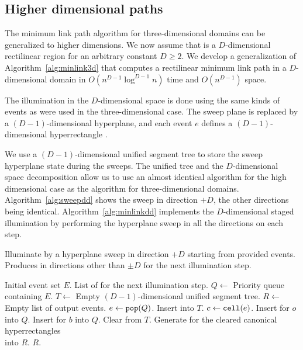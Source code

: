 \documentclass[english,gradu]{tktltiki2018}
\begin{document}
\subsection{Higher dimensional paths}

The minimum link path algorithm for three-dimensional domains can be generalized to higher dimensions.
We now assume that \fspace is a $D$-dimensional rectilinear region for an arbitrary constant $D\ge 2$.
We develop a generalization of Algorithm~\ref{alg:minlink3d} that computes a rectilinear minimum link path in a $D$-dimensional domain in $O(n^{D-1}\log^{D-1}n)$ time and $O(n^{D-1})$ space.

The illumination in the $D$-dimensional space is done using the same kinds of events as were used in the three-dimensional case.
The sweep plane is replaced by a $(D-1)$-dimensional hyperplane, and each event $e$ defines a $(D-1)$-dimensional hyperrectangle .

We use a $(D-1)$-dimensional unified segment tree to store the sweep hyperplane state during the sweeps.
The unified tree and the $D$-dimensional space decomposition allow us to use an almost identical algorithm for the high dimensional case as the algorithm for three-dimensional domains.
Algorithm~\ref{alg:sweepdd} shows the sweep in direction $+D$, the other directions being identical.
Algorithm~\ref{alg:minlinkdd} implements the $D$-dimensional staged illumination by performing the hyperplane sweep in all the directions on each step.

\begin{algorithm}
\caption{Illuminate by a hyperplane sweep in direction $+D$ starting from provided events.
	Produces \addEs in directions other than $\pm D$ for the next illumination step.}
\label{alg:sweepdd}
\begin{algorithmic}
\Require Initial event set $E$.
\Output List of \addEs for the next illumination step.
\State $Q\gets$ Priority queue containing $E$.
\State $T\gets$ Empty $(D-1)$-dimensional unified segment tree.
\State $R\gets$ Empty list of output events.
	\State $e\gets\texttt{pop}(Q)$.
		\State Insert  into $T$.
			\State $c\gets\mathtt{cell}(e)$.
				\State Insert \obsE for $o$ into $Q$.
			\EndFor
				\State Insert \cellE for $b$ into $Q$.
			\EndFor
		\EndIf
		\State Clear  from $T$.
		\State Generate \addEs for the cleared canonical hyperrectangles \\
			\hspace{20mm} into $R$.
	\EndIf
\EndWhile
\State \Return $R$.
\end{algorithmic}
\end{algorithm}
\end{document}
